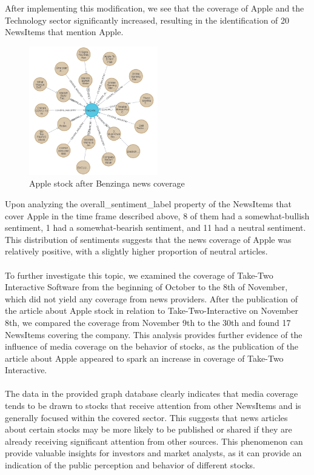After implementing this modification, we see that the coverage of Apple and the Technology sector significantly increased, resulting in the identification of 20 NewsItems that mention Apple.

\begin{figure}[h]
 \centering
 \includegraphics[width=0.5\textwidth]{images/apple-after-benzinga.png}
 \caption{Apple stock after Benzinga news coverage }
 \label{fig:newsitems-apple-after-benzinga-coverage}
\end{figure}

Upon analyzing the overall\_sentiment\_label property of the NewsItems that cover Apple in the time frame described above, 8 of them had a somewhat-bullish sentiment, 1 had a somewhat-bearish sentiment, and 11 had a neutral sentiment. This distribution of sentiments suggests that the news coverage of Apple was relatively positive, with a slightly higher proportion of neutral articles. \\
\\
To further investigate this topic, we examined the coverage of Take-Two Interactive Software from the beginning of October to the 8th of November, which did not yield any coverage from news providers. After the publication of the article about Apple stock in relation to Take-Two-Interactive on November 8th, we compared the coverage from November 9th to the 30th and found 17 NewsItems covering the company. This analysis provides further evidence of the influence of media coverage on the behavior of stocks, as the publication of the article about Apple appeared to spark an increase in coverage of Take-Two Interactive.\\
\\
The data in the provided graph database clearly indicates that media coverage tends to be drawn to stocks that receive attention from other NewsItems and is generally focused within the covered sector. This suggests that news articles about certain stocks may be more likely to be published or shared if they are already receiving significant attention from other sources. This phenomenon can provide valuable insights for investors and market analysts, as it can provide an indication of the public perception and behavior of different stocks.



